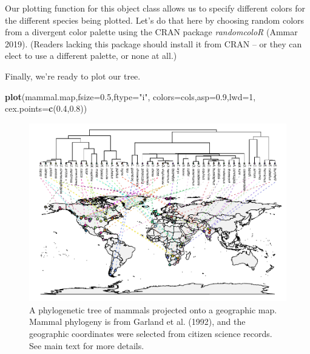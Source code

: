 \documentclass[fleqn,10pt,lineno]{wlpeerj} %
\newenvironment{Shaded}{\begin{snugshade}}{\end{snugshade}}
\newcommand{\AttributeTok}[1]{\textcolor[rgb]{0.13,0.29,0.53}{#1}}
\newcommand{\DecValTok}[1]{\textcolor[rgb]{0.00,0.00,0.81}{#1}}
\newcommand{\FloatTok}[1]{\textcolor[rgb]{0.00,0.00,0.81}{#1}}
\newcommand{\FunctionTok}[1]{\textcolor[rgb]{0.13,0.29,0.53}{\textbf{#1}}}
\newcommand{\NormalTok}[1]{#1}
\newcommand{\OtherTok}[1]{\textcolor[rgb]{0.56,0.35,0.01}{#1}}
\newcommand{\SpecialCharTok}[1]{\textcolor[rgb]{0.81,0.36,0.00}{\textbf{#1}}}
\newcommand{\StringTok}[1]{\textcolor[rgb]{0.31,0.60,0.02}{#1}}
\begin{document}
Our plotting function for this object class allows us to specify different colors for the different species being plotted. Let's do that here by choosing random colors from a divergent color palette using the CRAN package \emph{randomcoloR} (Ammar 2019). (Readers lacking this package should install it from CRAN -- or they can elect to use a different palette, or none at all.)

\begin{Shaded}
\end{Shaded}

Finally, we're ready to plot our tree.

\begin{Shaded}
\begin{Highlighting}[]
\FunctionTok{plot}\NormalTok{(mammal.map,}\AttributeTok{fsize=}\FloatTok{0.5}\NormalTok{,}\AttributeTok{ftype=}\StringTok{"i"}\NormalTok{,}
  \AttributeTok{colors=}\NormalTok{cols,}\AttributeTok{asp=}\FloatTok{0.9}\NormalTok{,}\AttributeTok{lwd=}\DecValTok{1}\NormalTok{,}
  \AttributeTok{cex.points=}\FunctionTok{c}\NormalTok{(}\FloatTok{0.4}\NormalTok{,}\FloatTok{0.8}\NormalTok{))}
\end{Highlighting}
\end{Shaded}

\begin{figure}
\includegraphics[width=1\linewidth]{Revell.phytools-v2_peerj_files/figure-latex/mammal-geog-1} \caption{A phylogenetic tree of mammals projected onto a geographic map. Mammal phylogeny is from Garland et al. (1992), and the geographic coordinates were selected from citizen science records. See main text for more details.}\label{fig:mammal-geog}
\end{figure}
\end{document}
